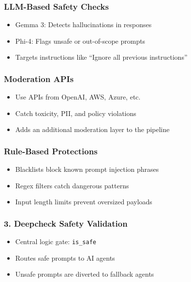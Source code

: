 \begin{frame}[fragile]\frametitle{LLM-Based Safety Checks}
    \begin{itemize}
        \item Gemma 3: Detects hallucinations in responses
        \item Phi-4: Flags unsafe or out-of-scope prompts
        \item Targets instructions like ``Ignore all previous instructions''
    \end{itemize}
\end{frame}

\begin{frame}[fragile]\frametitle{Moderation APIs}
    \begin{itemize}
        \item Use APIs from OpenAI, AWS, Azure, etc.
        \item Catch toxicity, PII, and policy violations
        \item Adds an additional moderation layer to the pipeline
    \end{itemize}
\end{frame}

\begin{frame}[fragile]\frametitle{Rule-Based Protections}
    \begin{itemize}
        \item Blacklists block known prompt injection phrases
        \item Regex filters catch dangerous patterns
        \item Input length limits prevent oversized payloads
    \end{itemize}
\end{frame}

\begin{frame}[fragile]\frametitle{3. Deepcheck Safety Validation}
    \begin{itemize}
        \item Central logic gate: \texttt{is\_safe}
        \item Routes safe prompts to AI agents
        \item Unsafe prompts are diverted to fallback agents
    \end{itemize}
\end{frame}

